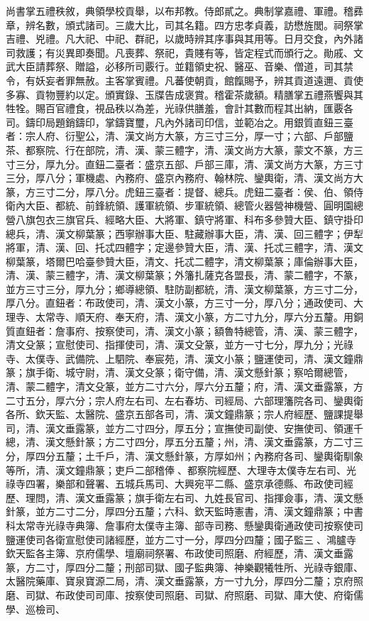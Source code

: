 \begin{pinyinscope}
尚書掌五禮秩敘，典領學校貢舉，以布邦教。侍郎貳之。典制掌嘉禮、軍禮。稽彞章，辨名數，頒式諸司。三歲大比，司其名籍。四方忠孝貞義，訪懋旌閭。祠祭掌吉禮、兇禮。凡大祀、中祀、群祀，以歲時辨其序事與其用等。日月交食，內外諸司救護；有災異即奏聞。凡喪葬、祭祀，貴賤有等，皆定程式而頒行之。勛戚、文武大臣請葬祭、贈謚，必移所司覈行。並籍領史祝、醫巫、音樂、僧道，司其禁令，有妖妄者罪無赦。主客掌賓禮。凡蕃使朝貢，館餼賜予，辨其貢道遠邇、貢使多寡、貢物豐約以定。頒實錄、玉牒告成褒賞。稽霍茶歲額。精膳掌五禮燕饗與其牲牷。賜百官禮食，視品秩以為差，光祿供膳羞，會計其數而程其出納，匯覈各司。鑄印局題銷鑄印，掌鑄寶璽，凡內外諸司印信，並範冶之。用銀質直鈕三臺者：宗人府、衍聖公，清、漢文尚方大篆，方三寸三分，厚一寸；六部、戶部鹽茶、都察院、行在部院，清、漢、蒙三體字，清、漢文尚方大篆，蒙文不篆，方三寸三分，厚九分。直鈕二臺者：盛京五部、戶部三庫，清、漢文尚方大篆，方三寸三分，厚八分；軍機處、內務府、盛京內務府、翰林院、鑾輿衛，清、漢文尚方大篆，方三寸二分，厚八分。虎鈕三臺者：提督、總兵。虎鈕二臺者：侯、伯、領侍衛內大臣、都統、前鋒統領、護軍統領、步軍統領、總管火器營神機營、圓明園總營八旗包衣三旗官兵、經略大臣、大將軍、鎮守將軍、科布多參贊大臣、鎮守掛印總兵，清、漢文柳葉篆；西寧辦事大臣、駐藏辦事大臣，清、漢、回三體字；伊犁將軍，清、漢、回、托忒四體字；定邊參贊大臣，清、漢、托忒三體字，清、漢文柳葉篆，塔爾巴哈臺參贊大臣，清文、托忒二體字，清文柳葉篆；庫倫辦事大臣，清、漢、蒙三體字，清、漢文柳葉篆；外籓扎薩克各盟長，清、蒙二體字，不篆，並方三寸三分，厚九分；鄉導總領、駐防副都統，清、漢文柳葉篆，方三寸二分，厚八分。直鈕者：布政使司，清、漢文小篆，方三寸一分，厚八分；通政使司、大理寺、太常寺、順天府、奉天府，清、漢文小篆，方二寸九分，厚六分五釐。用銅質直鈕者：詹事府、按察使司，清、漢文小篆；額魯特總管，清、漢、蒙三體字，清文殳篆；宣慰使司、指揮使司，清、漢文殳篆，並方一寸七分，厚九分；光祿寺、太僕寺、武備院、上駟院、奉宸苑，清、漢文小篆；鹽運使司，清、漢文鐘鼎篆；旗手衛、城守尉，清、漢文殳篆；衛守備，清、漢文懸針篆；察哈爾總管，清、蒙二體字，清文殳篆，並方二寸六分，厚六分五釐；府，清、漢文垂露篆，方二寸五分，厚六分；宗人府左右司、左右春坊、司經局、六部理籓院各司、鑾輿衛各所、欽天監、太醫院、盛京五部各司，清、漢文鐘鼎篆；宗人府經歷、鹽課提舉司，清、漢文垂露篆，並方二寸四分，厚五分；宣撫使司副使、安撫使司、領運千總，清、漢文懸針篆；方二寸四分，厚五分五釐；州，清、漢文垂露篆，方二寸三分，厚四分五釐；土千戶，清、漢文懸針篆，方厚如州；內務府各司、鑾輿衛馴象等所，清、漢文鐘鼎篆；吏戶二部稽俸、都察院經歷、大理寺太僕寺左右司、光祿寺四署，樂部和聲署、五城兵馬司、大興宛平二縣、盛京承德縣、布政使司經歷、理問，清、漢文垂露篆；旗手衛左右司、九姓長官司、指揮僉事，清、漢文懸針篆，並方二寸二分，厚四分五釐；六科、欽天監時憲書，清、漢文鐘鼎篆；中書科太常寺光祿寺典簿、詹事府太僕寺主簿、部寺司務、懸鑾輿衛通政使司按察使司鹽運使司各衛宣慰使司諸經歷，並方二寸一分，厚四分四釐；國子監三、鴻臚寺欽天監各主簿、京府儒學、壇廟祠祭署、布政使司照磨、府經歷，清、漢文垂露篆，方二寸，厚四分二釐；刑部司獄、國子監典簿、神樂觀犧牲所、光祿寺銀庫、太醫院藥庫、寶泉寶源二局，清、漢文垂露篆，方一寸九分，厚四分二釐；京府照磨、司獄、布政使司司庫、按察使司照磨、司獄、府照磨、司獄、庫大使、府衛儒學、巡檢司、
\end{pinyinscope}
